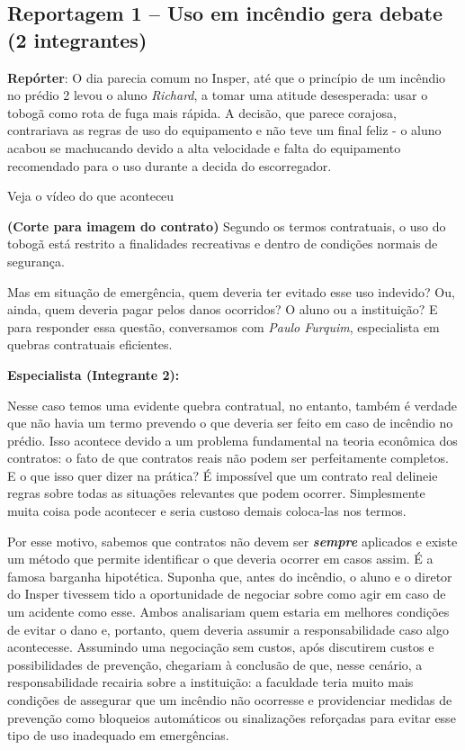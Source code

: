 \documentclass[a4paper,12pt]{article}[abntex2]
\begin{document}
\subsection*{Reportagem 1 – Uso em incêndio gera debate (2 integrantes)}

\textbf{Repórter}:
O dia parecia comum no Insper, até que o princípio de um incêndio no prédio 2 levou o aluno \textit{Richard}, a tomar uma atitude desesperada: usar o tobogã como rota de fuga mais rápida.\newline
A decisão, que parece corajosa, contrariava as regras de uso do equipamento e não teve um final feliz - o aluno acabou se machucando devido a alta velocidade e falta do equipamento recomendado para o uso durante a decida do escorregador. \newline

Veja o vídeo do que aconteceu

\textbf{(Corte para imagem do contrato)}
Segundo os termos contratuais, o uso do tobogã está restrito a finalidades recreativas e dentro de condições normais de segurança.\newline

Mas em situação de emergência, quem deveria ter evitado esse uso indevido? Ou, ainda, quem deveria pagar pelos danos ocorridos? O aluno ou a instituição? E para responder essa questão, conversamos com \textit{Paulo Furquim}, especialista em quebras contratuais eficientes.\newline

\textbf{Especialista (Integrante 2):}\newline

Nesse caso temos uma evidente quebra contratual, no entanto, também é verdade que não havia um termo prevendo o que deveria ser feito em caso de incêndio no prédio. Isso acontece devido a um problema fundamental na teoria econômica dos contratos: o fato de que contratos reais não podem ser perfeitamente completos. E o que isso quer dizer na prática? É impossível que um contrato real delineie regras sobre todas as situações relevantes que podem ocorrer. Simplesmente muita coisa pode acontecer e seria custoso demais coloca-las nos termos.\newline

Por esse motivo, sabemos que contratos não devem ser \textbf{\textit{sempre}} aplicados e existe um método que permite identificar o que deveria ocorrer em casos assim. É a famosa barganha hipotética.\newline
Suponha que, antes do incêndio, o aluno e o diretor do Insper tivessem tido a oportunidade de negociar sobre como agir em caso de um acidente como esse. Ambos analisariam quem estaria em melhores condições de evitar o dano e, portanto, quem deveria assumir a responsabilidade caso algo acontecesse. Assumindo uma negociação sem custos, após discutirem custos e possibilidades de prevenção, chegariam à conclusão de que, nesse cenário, a responsabilidade recairia sobre a instituição:  a faculdade teria muito mais condições de assegurar que um incêndio não ocorresse e providenciar medidas de prevenção como bloqueios automáticos ou sinalizações reforçadas para evitar esse tipo de uso inadequado em emergências. \newline 
\end{document}
